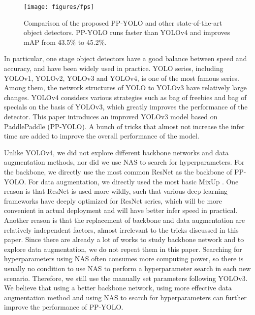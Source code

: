 \documentclass[10pt,twocolumn,letterpaper]{article}
\begin{document}
	\begin{figure}[t]
		\begin{center}
			\texttt{[image: figures/fps]}
		\end{center}
		\caption{Comparison of the proposed  PP-YOLO and other state-of-the-art object detectors.  PP-YOLO runs faster than YOLOv4 and improves mAP from 43.5\% to 45.2\%.}
		\label{fig:fps}
	\end{figure}
	
	In particular, one stage object detectors have a good balance between speed and accuracy, and have been widely used in practice\cite{ssd, retinanet, YOLO16, yolov2, yolov3, yolov4}. 
	YOLO series, including YOLOv1\cite{YOLO16}, YOLOv2\cite{yolov2}, YOLOv3\cite{yolov3}  and YOLOv4\cite{yolov4}, is one of the most famous series. Among them, the network structures of YOLO to YOLOv3 have relatively large changes. YOLOv4 considers various strategies such as bag of freebies and bag of specials on the basis of YOLOv3, which greatly improves the performance of the detector.
	This paper introduces an improved YOLOv3 model based on PaddlePaddle (PP-YOLO). A bunch of tricks that almost not increase the infer time are added to improve the overall performance of the model.
	
	Unlike YOLOv4, we did not explore different backbone networks and data augmentation methods, nor did we use NAS to search for hyperparameters.
	For the backbone, we directly use the most common ResNet\cite{resnet} as the backbone of PP-YOLO. For data augmentation, we directly used the most basic MixUp \cite{mixup}.
	One reason is that ResNet is used more wildly, such that various deep learning frameworks have deeply optimized for ResNet series, which will be more convenient in actual deployment and will have better infer speed in practical.
	Another reason is that the replacement of backbone and data augmentation are relatively independent factors, almost irrelevant to the tricks discussed in this paper. Since there are already a lot of works to study backbone network and to explore data augmentation, we do not repeat them in this paper.
	Searching for hyperparameters using NAS often consumes more computing power, so there is usually no condition to use NAS to perform a hyperparameter search in each new scenario. Therefore, we still use the manually set parameters following YOLOv3\cite{yolov3}.
We believe that using a better backbone network, using more effective data augmentation method and using NAS to search for hyperparameters can further improve the performance of PP-YOLO.
	
\end{document}
